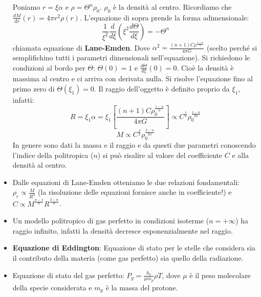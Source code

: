 \documentclass[11pt,a4paper]{article}
\begin{document}
\begin{itemize}
Poniamo $r = \xi \alpha$ e $\rho = \Theta^n \rho_0$. $\rho_0$ è la densità al centro. Ricordiamo che $\frac{dM}{dr} \left( r \right) = 4 \pi r^2 \rho \left( r \right)$. L'equazione di sopra prende la forma adimensionale:
\begin{equation}
\frac{1}{\xi^2} \frac{d}{d \xi} \left( \xi^2 \frac{d \Theta}{d \xi} \right) = - \Theta ^ n
\end{equation}
chiamata equazione di \textbf{Lane-Emden}. Dove $\alpha^2 = \frac{(n+1)C\rho^{\frac{1-n}{n}}}{4 \pi G}$ (scelto perché si semplifichino tutti i parametri dimensionali nell'equazione). Si richiedono le condizioni al bordo per $\Theta$: $\Theta(0) = 1$ e $\frac{d \Theta}{d \xi} \left( 0 \right) = 0$. Cioè la densità è massima al centro e ci arriva con derivata nulla.
Si risolve l'equazione fino al primo zero di $\Theta \left( \xi_1 \right) = 0$.
Il raggio dell'oggetto è definito proprio da $\xi_1$, infatti:
\begin{equation}
R = \xi_1 \alpha = \xi_1 \left[ \frac{(n+1) C \rho_0^{\frac{1-n}{n}}}{4 \pi G} \right] \propto C^{\frac{1}{2}} \rho_0 ^{\frac{1-n}{2n}}
\label{firstLane}
\end{equation}
\begin{equation}
M \propto C^{\frac{3}{2}} \rho_0 ^ {\frac{3-n}{2 n}}
\label{secondLane}
\end{equation}
In genere sono dati la massa e il raggio e da questi due parametri conoscendo l'indice della politropica ($n$) si può risalire al valore del coefficiente $C$ e alla densità al centro.

\item Dalle equazioni di Lane-Emden otteniamo le due relazioni fondamentali: $\rho_c \propto \frac{M}{R^3}$ (la risoluzione delle equazioni fornisce anche in coefficiente!) e $C \propto M^{\frac{n-1}{n}} R^{\frac{3-n}{n}}$.

\item Un modello politropico di gas perfetto in condizioni isoterme ($n = +\infty$) ha raggio infinito, infatti la densità decresce esponenzialmente nel raggio.

\item \textbf{Equazione di Eddington}: Equazione di stato per le stelle che considera sia il contributo della materia (come gas perfetto) sia quello della radiazione.

\item Equazione di stato del gas perfetto: $P_g = \frac{k_b}{\mu m_p} \rho T$, dove $\mu$ è il peso molecolare della specie considerata e $m_p$ è la massa del protone.


\end{itemize}
\end{document}
